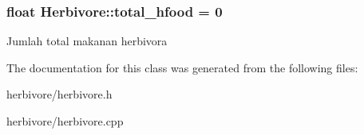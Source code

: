\subsubsection[{\texorpdfstring{total\+\_\+hfood}{total_hfood}}]{\setlength{\rightskip}{0pt plus 5cm}float Herbivore\+::total\+\_\+hfood = 0\hspace{0.3cm}{\ttfamily [static]}}\hypertarget{classHerbivore_a8bd02e6119cd6950a37a8ef3e262fa0a}{}\label{classHerbivore_a8bd02e6119cd6950a37a8ef3e262fa0a}
Jumlah total makanan herbivora 

The documentation for this class was generated from the following files\+:\begin{DoxyCompactItemize}
\item 
herbivore/herbivore.\+h\item 
herbivore/herbivore.\+cpp\end{DoxyCompactItemize}

